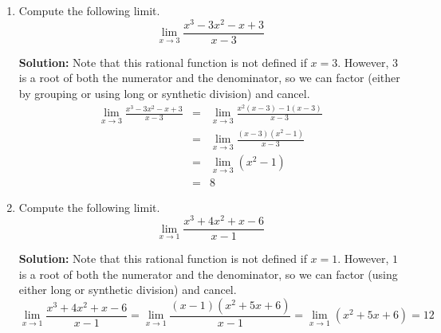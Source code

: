 \documentclass{article}
\begin{document}
\begin{enumerate}
  
\vspace{1cm}

\item Compute the following limit. \[ \lim_{x \rightarrow 3} \frac{x^3 - 3x^2 - x + 3}{x - 3} \]

\textbf{Solution:} Note that this rational function is not defined if $x = 3$. However, $3$ is a root of both the numerator and the denominator, so we can factor (either by grouping or using long or synthetic division) and cancel.
\begin{eqnarray*}
\lim_{x \rightarrow 3} \frac{x^3 - 3x^2 - x + 3}{x - 3} & = & \lim_{x \rightarrow 3} \frac{x^2(x - 3) - 1(x - 3)}{x - 3} \\
 & = & \lim_{x \rightarrow 3} \frac{(x - 3)(x^2 - 1)}{x - 3} \\
 & = & \lim_{x \rightarrow 3} (x^2 - 1) \\
 & = & 8
\end{eqnarray*}


  
\vspace{1cm}

\item Compute the following limit. \[ \lim_{x \rightarrow 1} \frac{x^3 + 4x^2 + x - 6}{x - 1} \]

\textbf{Solution:} Note that this rational function is not defined if $x = 1$. However, $1$ is a root of both the numerator and the denominator, so we can factor (using either long or synthetic division) and cancel.
\[ \lim_{x \rightarrow 1} \frac{x^3 + 4x^2 + x - 6}{x - 1} = \lim_{x \rightarrow 1} \frac{(x - 1)(x^2 + 5x + 6)}{x - 1} = \lim_{x \rightarrow 1} (x^2 + 5x + 6) = 12 \]


  
\vspace{1cm}
\end{enumerate}
\end{document}
